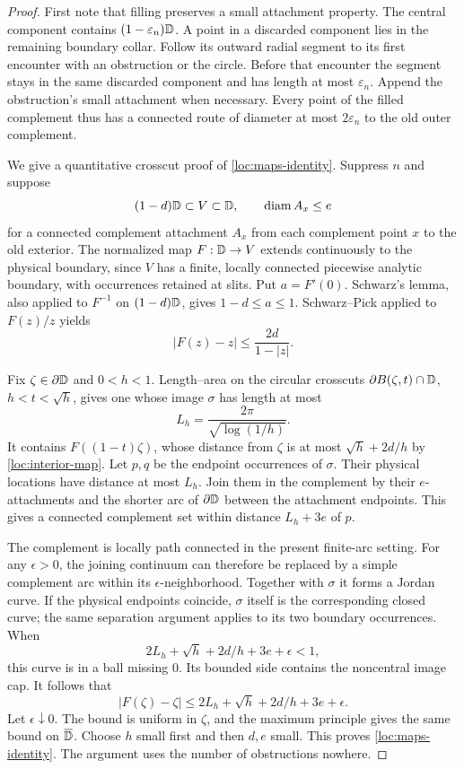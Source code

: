\begin{proof}
First note that filling preserves a small attachment property.
The central component contains \((1-\varepsilon_n)\mathbb D\).
A point in a discarded component lies in the remaining
boundary collar. Follow its outward radial segment to its
first encounter with an obstruction or the circle. Before
that encounter the segment stays in the same discarded
component and has length at most \(\varepsilon_n\).
Append the obstruction's small attachment when necessary.
Every point of the filled complement thus has a connected
route of diameter at most \(2\varepsilon_n\) to the old
outer complement.

We give a quantitative crosscut proof of
\eqref{loc:maps-identity}. Suppress \(n\) and suppose
\[
 (1-d)\mathbb D\subset V\subset\mathbb D,\qquad
 \operatorname{diam} A_x\le e
\]
for a connected complement attachment \(A_x\) from each
complement point \(x\) to the old exterior. The normalized
map \(F:\mathbb D\to V\) extends continuously to the physical
boundary, since \(V\) has a finite, locally connected
piecewise analytic boundary, with occurrences retained at
slits. Put \(a=F'(0)\). Schwarz's lemma, also applied to
\(F^{-1}\) on \((1-d)\mathbb D\), gives \(1-d\le a\le1\).
Schwarz--Pick applied to \(F(z)/z\) yields
\begin{equation}
 |F(z)-z|\le\frac{2d}{1-|z|}.
 \label{loc:interior-map}
\end{equation}

Fix \(\zeta\in\partial\mathbb D\) and \(0<h<1\).
Length--area on the circular crosscuts
\(\partial B(\zeta,t)\cap\mathbb D\), \(h<t<\sqrt h\),
gives one whose image \(\sigma\) has length at most
\[
 L_h=\frac{2\pi}{\sqrt{\log(1/h)}}.
\]
It contains \(F((1-t)\zeta)\), whose distance from \(\zeta\)
is at most \(\sqrt h+2d/h\) by
\eqref{loc:interior-map}. Let \(p,q\) be the endpoint
occurrences of \(\sigma\). Their physical locations have
distance at most \(L_h\). Join them in the complement by
their \(e\)-attachments and the shorter arc of
\(\partial\mathbb D\) between the attachment endpoints.
This gives a connected complement set within distance
\(L_h+3e\) of \(p\).

The complement is locally path connected in the present
finite-arc setting. For any \(\epsilon>0\), the joining
continuum can therefore be replaced by a simple complement
arc within its \(\epsilon\)-neighborhood. Together with
\(\sigma\) it forms a Jordan curve. If the physical endpoints
coincide, \(\sigma\) itself is the corresponding closed curve;
the same separation argument applies to its two boundary
occurrences. When
\[
 2L_h+\sqrt h+2d/h+3e+\epsilon<1,
\]
this curve is in a ball missing \(0\). Its bounded side
contains the noncentral image cap. It follows that
\[
 |F(\zeta)-\zeta|
 \le2L_h+\sqrt h+2d/h+3e+\epsilon .
\]
Let \(\epsilon\downarrow0\). The bound is uniform in
\(\zeta\), and the maximum principle gives the same bound
on \(\overline{\mathbb D}\). Choose \(h\) small first and then
\(d,e\) small. This proves \eqref{loc:maps-identity}.
The argument uses the number of obstructions nowhere.


\end{proof}
